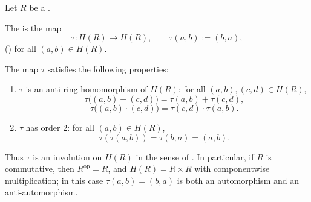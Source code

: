 \begin{definition} \label{definition:standard_involution_on_the_hyperbolic_ring_of_a_ring}
    Let $R$ be a .

    The  is the map
    $$ \tau: H(R) \to H(R), \qquad \tau(a,b) := (b,a), $$
    ()
    for all $(a,b) \in H(R)$.

    The map $\tau$ satisfies the following properties:
    \begin{enumerate}
        \item $\tau$ is an anti-ring-homomorphism of $H(R)$: for all $(a,b), (c,d) \in H(R)$,
        $$ \tau\big((a,b) + (c,d)\big) = \tau(a,b) + \tau(c,d), $$
        $$ \tau\big((a,b) \cdot (c,d)\big) = \tau(c,d) \cdot \tau(a,b). $$
        \item $\tau$ has order $2$: for all $(a,b) \in H(R)$,
        $$ \tau(\tau(a,b)) = \tau(b,a) = (a,b). $$
    \end{enumerate}

    Thus $\tau$ is an involution on $H(R)$ in the sense of . In particular, if $R$ is commutative, then $R^{\mathrm{op}} = R$, and $H(R) = R \times R$ with componentwise multiplication; in this case $\tau(a,b) = (b,a)$ is both an automorphism and an anti-automorphism.
\end{definition}
